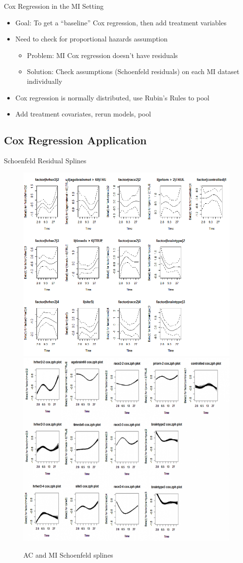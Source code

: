 \begin{frame}{Cox Regression in the MI Setting}
\begin{itemize}
 \item Goal: To get a ``baseline'' Cox regression, then add treatment variables
 \item Need to check for proportional hazards assumption
 \begin{itemize}
  \item Problem:  MI Cox regression doesn't have residuals
  \item Solution: Check assumptions (Schoenfeld residuals) on each MI dataset individually
 \end{itemize}
\item Cox regression is normally distributed, use Rubin's Rules to pool
\item Add treatment covariates, rerun models, pool
\end{itemize}
\end{frame}

\subsection{Cox Regression Application}
\begin{frame}{Schoenfeld Residual Splines}
\begin{figure}[h!]
  \centering
\includegraphics[width=.5\textwidth]{ac_schoenfeld}%
\includegraphics[width=.5\textwidth]{mi_schoenfeld} 
\caption{AC and MI Schoenfeld splines}
\end{figure}
\end{frame}


